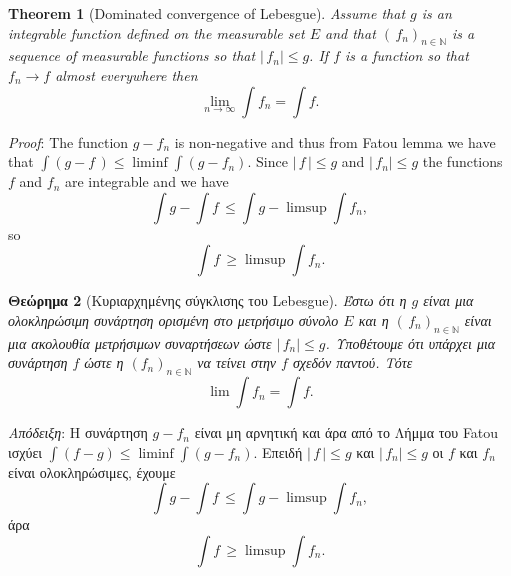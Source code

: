 \documentclass{article}
\newtheorem{theorem}{Theorem}
\newtheorem{theoremg}[theorem]{Θεώρημα}
\begin{document}
\begin{theorem}[Dominated convergence of Lebesgue]
Assume that $g$ is an
in\-te\-grable func\-tion defined on the measurable set $E$ and that
  $(\,f_n)_{n\in\mathbb N}$ is a sequence of mea\-sur\-able functions so that
  $|\,f_n|\leq g$. If $f$ is a function so that $f_n\to f$ almost everywhere
  then $$\lim_{n\to\infty}\int f_n=\int f.$$
\end{theorem}
\textit{Proof}: The function $g-f_n$ is non-negative and thus from Fatou lemma
we have that $\int(g-f\,)\leq\liminf\int(g-f_n)$. Since $|\,f\,|\leq g$ and
$|\,f_n|\leq g$ the  functions $f$ and $f_n$ are integrable and we have
$$\int g-\int f\,\leq \int g-\limsup\int f_n,$$ so
$$\int f\,\geq \limsup \int f_n.$$
\par
\begin{theoremg}[Κυριαρχημένης σύγκλισης του Lebesgue]
  Έστω ότι
η $g$ είναι μια ολοκληρώσιμη συνάρτηση ορισμένη στο μετρήσιμο σύνολο
$E$ και η $(\,f_n)_{n\in\mathbb N}$ είναι μια ακολουθία μετρήσιμων συναρτήσεων ώστε
$|\,f_n| ≤ g$. Υποθέτουμε ότι υπάρχει μια συνάρτηση $f$
ώστε η  $(f_n)_{n\in\mathbb N}$ να
τείνει στην $f$ σχεδόν παντού. Τότε
$$\lim \int f_n =\int f.$$
\end{theoremg}
\textit{Απόδειξη}: Η συνάρτηση $g − f_n$ είναι μη αρνητική και άρα από
το Λήμμα του Fatou ισχύει
$\int (f-g) ≤ \liminf \int (g-f_n)$. Επειδή
$|\,f\,| ≤ g$ και $|\,f_n| ≤g$ οι $f$ και $f_n$ είναι ολοκληρώσιμες, έχουμε
$$\int g −\int f\, ≤ \int g − \limsup\int f_n,$$
άρα
$$\int f\,\geq \limsup \int f_n.$$
\end{document}
